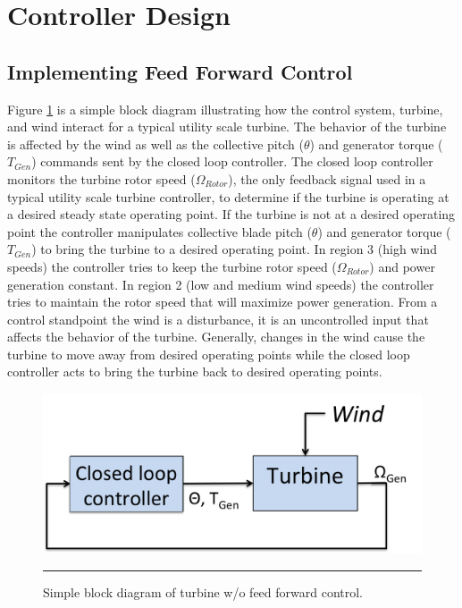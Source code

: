 \section{Controller Design} \label{section3-3}

\subsection{Implementing Feed Forward Control} \label{section3-3-1}

Figure \ref{fig3-7} is a simple block diagram illustrating how the control system, turbine, and wind interact for a typical utility scale turbine. The behavior of the turbine is affected by the wind as well as the collective pitch ($\theta$) and generator torque ($T_{Gen}$) commands sent by the closed loop controller. The closed loop controller monitors the turbine rotor speed ($\Omega_{Rotor}$), the only feedback signal used in a typical utility scale turbine controller, to determine if the turbine is operating at a desired steady state operating point. If the turbine is not at a desired operating point the controller manipulates collective blade pitch ($\theta$) and generator torque ($T_{Gen}$) to bring the turbine to a desired operating point. In region 3 (high wind speeds) the controller tries to keep the turbine rotor speed ($\Omega_{Rotor}$) and power generation constant. In region 2 (low and medium wind speeds) the controller tries to maintain the rotor speed that will maximize power generation. From a control standpoint the wind is a disturbance, it is an uncontrolled input that affects the behavior of the turbine. Generally, changes in the wind cause the turbine to move away from desired operating points while the closed loop controller acts to bring the turbine back to desired operating points.


 \begin{figure}[htbp]
	\centering
		\includegraphics[width=.6\linewidth]{Figures/ch3Figures/fig3-7.png}
		\rule{35em}{0.5pt}
	\caption{Simple block diagram of turbine w/o feed forward control.}
	\label{fig3-7}
\end{figure}

